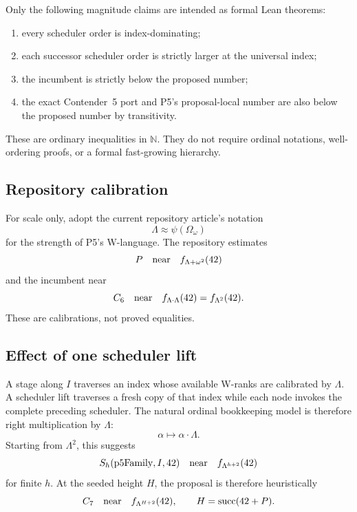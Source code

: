 \documentclass[11pt]{article}
\theoremstyle{definition}
\theoremstyle{remark}
\newcommand{\Nat}{\mathbb N}
\newcommand{\Idx}{I}
\newcommand{\Pfive}{P}
\newcommand{\Height}{H}
\begin{document}
Only the following magnitude claims are intended as formal Lean theorems:
\begin{enumerate}[leftmargin=*]
\item every scheduler order is index-dominating;
\item each successor scheduler order is strictly larger at the universal index;
\item the incumbent is strictly below the proposed number;
\item the exact Contender~5 port and P5's proposal-local number are also below
      the proposed number by transitivity.
\end{enumerate}
These are ordinary inequalities in \(\Nat\).  They do not require ordinal
notations, well-ordering proofs, or a formal fast-growing hierarchy.

\subsection{Repository calibration}

For scale only, adopt the current repository article's notation
\[
 \Lambda\approx\psi(\Omega_\omega)
\]
for the strength of P5's W-language.  The repository estimates
\[
 \Pfive\quad\hbox{near}\quad f_{\Lambda+\omega^2}(42)
\]
and the incumbent near
\[
 C_6\quad\hbox{near}\quad f_{\Lambda\cdot\Lambda}(42)
 =f_{\Lambda^2}(42).
\]
These are calibrations, not proved equalities.

\subsection{Effect of one scheduler lift}

A stage along \(\Idx\) traverses an index whose available W-ranks are calibrated
by \(\Lambda\).  A scheduler lift traverses a fresh copy of that index while
each node invokes the complete preceding scheduler.  The natural ordinal
bookkeeping model is therefore right multiplication by \(\Lambda\):
\[
 \alpha\longmapsto\alpha\cdot\Lambda.
\]
Starting from \(\Lambda^2\), this suggests
\[
 S_h(\operatorname{p5Family},\Idx,42)
 \quad\hbox{near}\quad f_{\Lambda^{h+2}}(42)
\]
for finite \(h\).  At the seeded height \(\Height\), the proposal is therefore
heuristically
\begin{equation}\label{eq:heuristic}
 C_7\quad\hbox{near}\quad f_{\Lambda^{\Height+2}}(42),
 \qquad
 \Height=\operatorname{succ}(42+\Pfive).
\end{equation}
\end{document}
